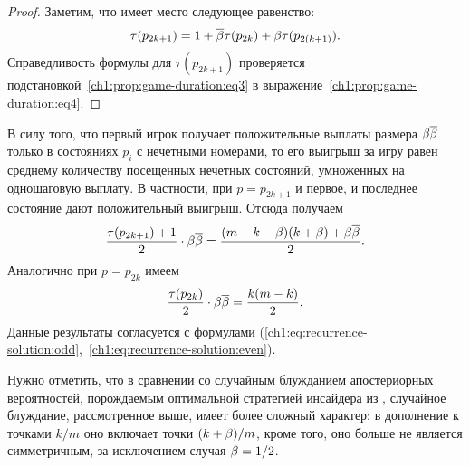 {\begin{proof}
  Заметим, что имеет место следующее равенство:
  \begin{equation}
    \label{ch1:prop:game-duration:eq4}
    \tau(p_{2k+1}) = 1 + {{\overline{\beta}}} \tau(p_{2k}) + \beta \tau(p_{2(k+1)}).
  \end{equation}
  Справедливость формулы для $\tau(p_{2k+1})$ проверяется подстановкой~\eqref{ch1:prop:game-duration:eq3} в выражение~\eqref{ch1:prop:game-duration:eq4}.
\end{proof}

В силу того, что первый игрок получает положительные выплаты размера $\beta{{\overline{\beta}}}$ только в состояниях $p_i$ с нечетными номерами, то его выигрыш за игру равен среднему количеству посещенных нечетных состояний, умноженных на одношаговую выплату. В частности, при $p = p_{2k+1}$ и первое, и последнее состояние дают положительный выигрыш. Отсюда получаем
\begin{equation*}
  \frac{\tau(p_{2k+1}) + 1}{2} \cdot \beta{{\overline{\beta}}} = \frac{(m-k-\beta)(k+\beta) + \beta{{\overline{\beta}}}}{2}.
\end{equation*}
Аналогично при $p = p_{2k}$ имеем
\begin{equation*}
  \frac{\tau(p_{2k})}{2} \cdot \beta{{\overline{\beta}}} = \frac{k(m-k)}{2}.
\end{equation*}
Данные результаты согласуется с формулами (\ref{ch1:eq:recurrence-solution:odd},~\ref{ch1:eq:recurrence-solution:even}).

Нужно отметить, что в сравнении со случайным блужданием апостериорных вероятностей, порождаемым оптимальной стратегией инсайдера из \cite{domansky07}, случайное блуждание, рассмотренное выше, имеет более сложный характер: в дополнение к точками $k/m$ оно включает точки $(k+\beta)/m$, кроме того, оно больше не является симметричным, за исключением случая $\beta = 1/2$.

}
